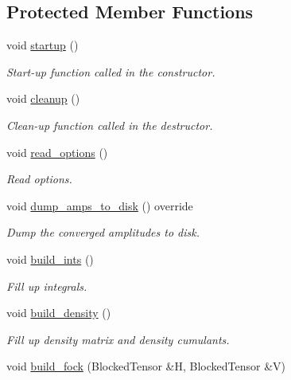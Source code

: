 \subsection*{Protected Member Functions}
\begin{DoxyCompactItemize}
\item 
void \mbox{\hyperlink{classforte_1_1_m_r_d_s_r_g_add18dfdea6a71cc0fd2efffcc5330c24}{startup}} ()
\begin{DoxyCompactList}\small\item\em Start-\/up function called in the constructor. \end{DoxyCompactList}\item 
void \mbox{\hyperlink{classforte_1_1_m_r_d_s_r_g_a42be8af22ccb44d3174c14cc0484a1fe}{cleanup}} ()
\begin{DoxyCompactList}\small\item\em Clean-\/up function called in the destructor. \end{DoxyCompactList}\item 
void \mbox{\hyperlink{classforte_1_1_m_r_d_s_r_g_a555207edea096396e17db85312eb4971}{read\+\_\+options}} ()
\begin{DoxyCompactList}\small\item\em Read options. \end{DoxyCompactList}\item 
void \mbox{\hyperlink{classforte_1_1_m_r_d_s_r_g_aee87aff2861a0aa4be1d6486d7054049}{dump\+\_\+amps\+\_\+to\+\_\+disk}} () override
\begin{DoxyCompactList}\small\item\em Dump the converged amplitudes to disk. \end{DoxyCompactList}\item 
void \mbox{\hyperlink{classforte_1_1_m_r_d_s_r_g_a9fb69b7eb9efca77194ace4e1d75d214}{build\+\_\+ints}} ()
\begin{DoxyCompactList}\small\item\em Fill up integrals. \end{DoxyCompactList}\item 
void \mbox{\hyperlink{classforte_1_1_m_r_d_s_r_g_a6ec6cfc8e455ec42db68c8256d817e61}{build\+\_\+density}} ()
\begin{DoxyCompactList}\small\item\em Fill up density matrix and density cumulants. \end{DoxyCompactList}\item 
void \mbox{\hyperlink{classforte_1_1_m_r_d_s_r_g_ab24f28f9f82c2158ec923c47943242fe}{build\+\_\+fock}} (Blocked\+Tensor \&H, Blocked\+Tensor \&V)

\end{DoxyCompactItemize}
